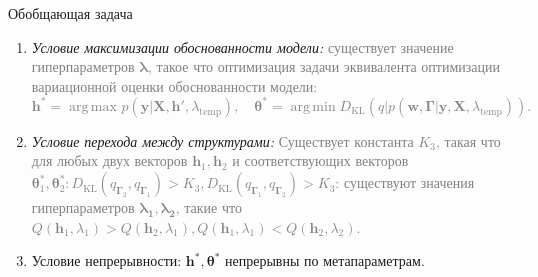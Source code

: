 \documentclass[usenames,dvipsnames,11pt,pdf,utf8,russian,aspectratio=43]{beamer}
\DeclareMathOperator*{\argmin}{arg\,min}
\DeclareMathOperator*{\argmax}{arg\,max}
\begin{document}
\begin{frame}{Обобщающая задача}
\begin{enumerate}
\item \textit{Условие максимизации обоснованности модели:}\textcolor{gray}{ существует значение гиперпараметров $\boldsymbol{\lambda}$, такое что оптимизация задачи эквивалента оптимизации вариационной оценки обоснованности модели:
\vspace{-0.2cm}
\[
    \mathbf{h}^{*} = \argmax_{} p(\mathbf{y}|\mathbf{X}, \mathbf{h}', \lambda_{\text{temp}}),\quad
    \boldsymbol{\theta}^{*} = \argmin D_\text{KL}(q| p(\mathbf{w}, \boldsymbol{\Gamma}|\mathbf{y}, \mathbf{X}, \lambda_{\text{temp}})).
\]}
\vspace{-0.6cm}
\item \textit{Условие перехода между структурами:}
\textcolor{gray}{
Существует константа $K_3$, такая что для любых двух векторов $\mathbf{h}_{1}, \mathbf{h}_2$ и соответствующих векторов $\boldsymbol{\theta}_1^{*},\boldsymbol{\theta}_2^{*}: D_\text{KL}(q_{\boldsymbol{\Gamma}_2}, q_{\boldsymbol{\Gamma}_1})>K_3, D_\text{KL}(q_{\boldsymbol{\Gamma}_1}, q_{\boldsymbol{\Gamma}_2})>K_3$:  существуют значения гиперпараметров $\boldsymbol{\lambda_1},\boldsymbol{\lambda_2}$, такие что  $Q(\mathbf{h}_1, \lambda_1) > Q(\mathbf{h}_2, \lambda_1), Q(\mathbf{h}_1, \lambda_1) < Q(\mathbf{h}_2, \lambda_2)$.
}
\item Условие непрерывности: $\mathbf{h}^{*}, \boldsymbol{\theta}^{*}$ непрерывны по метапараметрам.

\end{enumerate}
\end{frame}
\end{document}
